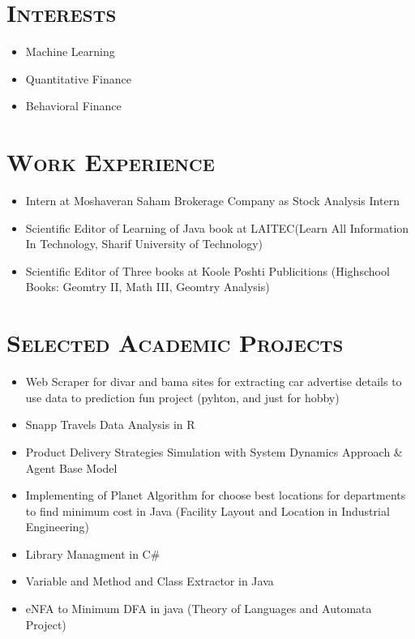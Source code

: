 \documentclass[line,margin]{res}
\begin{document}
\begin{resume}
\begin{spacing}{1.1}
\section{\textsc{Interests}}
\begin{itemize}
\item Machine Learning
\item Quantitative Finance
\item Behavioral Finance
\end{itemize}

\section{\textsc{Work Experience}}
\begin{itemize}
\item Intern at Moshaveran Saham Brokerage Company as Stock Analysis Intern
\item Scientific Editor of Learning of Java book at LAITEC(Learn All Information In Technology, Sharif University of Technology)
\item Scientific Editor of Three books at Koole Poshti Publicitions (Highschool Books: Geomtry II, Math
III, Geomtry Analysis)
\end{itemize}

\section{\textsc{Selected Academic Projects}}
\begin{itemize}
\item Web Scraper for divar and bama sites for extracting car advertise details  to use data to prediction fun project (pyhton, and just for hobby)
\item Snapp Travels Data Analysis in R
\item Product Delivery Strategies Simulation with System Dynamics Approach \& Agent Base Model
\item  Implementing of Planet Algorithm for choose best locations for departments to find minimum cost in Java (Facility Layout and Location in Industrial Engineering)

\item Library Managment in C\#
\item Variable and Method and Class Extractor in Java
\item eNFA to Minimum DFA in java (Theory of Languages and Automata Project)
\end{itemize}






\end{spacing}
\end{resume}
\end{document}
